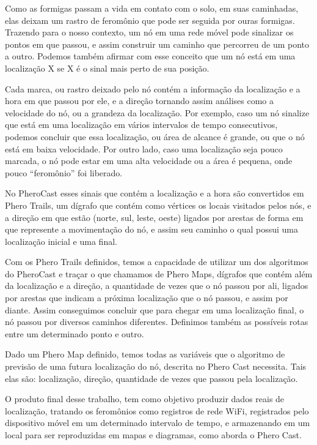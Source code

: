 \documentclass[12pt, %
openright, 
oneside,
a4paper,
brazil]{facom-ufu-abntex2}
\begin{document}
	Como as formigas passam a vida em contato com o solo, em suas caminhadas, elas deixam um rastro de feromônio que pode ser seguida por ouras formigas. Trazendo para o nosso contexto, um nó em uma rede móvel pode sinalizar os pontos em que passou, e assim construir um caminho que percorreu de um ponto a outro. Podemos também afirmar com esse conceito que um nó está em uma localização X se X é o sinal mais perto de sua posição.
	
	Cada marca, ou rastro deixado pelo nó contém a informação da localização e a hora em que passou por ele, e a direção tornando assim análises como a velocidade do nó, ou a grandeza da localização. Por exemplo, caso um nó sinalize que está em uma localização em vários intervalos de tempo consecutivos, podemos concluir que essa localização, ou área de alcance é grande, ou que o nó está em baixa velocidade. Por outro lado, caso uma localização seja pouco marcada, o nó pode estar em uma alta velocidade ou a área é pequena, onde pouco ``feromônio'' foi liberado.\cite{6838650} 
	
	No PheroCast esses sinais que contém a localização e a hora são convertidos em Phero Trails, um dígrafo que contém como vértices os locais visitados pelos nós, e a direção em que estão (norte, sul, leste, oeste) ligados  por arestas de forma em que represente a movimentação do nó, e assim seu caminho o qual possui uma localização inicial e uma final.\cite{6838650} 
	
	Com os Phero Trails definidos, temos a capacidade de utilizar um dos algoritmos do PheroCast e traçar o que chamamos de Phero Maps, dígrafos que contém além da localização e a direção, a quantidade de vezes que o nó passou por ali, ligados por arestas que indicam a próxima localização que o nó passou, e assim por diante. Assim conseguimos concluir que para chegar em uma localização final, o nó passou por diversos caminhos diferentes. Definimos também as possíveis rotas entre um determinado ponto e outro.\cite{6838650} 
	
	Dado um Phero Map definido, temos todas as variáveis que o algoritmo de previsão de uma futura localização do nó, descrita no Phero Cast necessita. Tais elas são: localização, direção, quantidade de vezes que passou pela localização. 
	
 	O produto final desse trabalho, tem como objetivo produzir dados reais de localização, tratando os feromônios como registros de rede \ac{WiFi}, registrados pelo dispositivo móvel em um determinado intervalo de tempo, e armazenando em um local para ser reproduzidas em mapas e diagramas, como aborda o Phero Cast.
\end{document}
